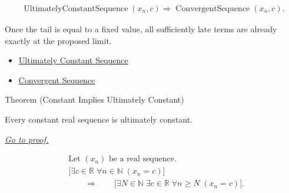\begin{remark*}
\[
\begin{aligned}
\operatorname{UltimatelyConstantSequence}(x_n,c)
\Longrightarrow
\operatorname{ConvergentSequence}(x_n,c).
\end{aligned}
\]
\end{remark*}

\begin{remark*}[Interpretation]
Once the tail is equal to a fixed value, all sufficiently late terms are
already exactly at the proposed limit.
\end{remark*}

\begin{dependencies}
\begin{itemize}
  \item \hyperref[def:ultimately-constant-sequence]{Ultimately Constant Sequence}
  \item \hyperref[def:convergent-sequence]{Convergent Sequence}
\end{itemize}
\end{dependencies}


\begin{theorembox}{Theorem (Constant Implies Ultimately Constant)}
\begin{theorem}
\label{thm:constant-implies-ultimately-constant}
Every constant real sequence is ultimately constant.

\smallskip
\noindent
\hyperref[prf:constant-implies-ultimately-constant]{\textit{Go to proof.}}
\end{theorem}
\end{theorembox}

\begin{remark*}
\[
\begin{aligned}
&\text{Let } (x_n) \text{ be a real sequence.}\\
&\bigl[
\exists c \in \mathbb{R}\;
\forall n \in \mathbb{N}\;(x_n = c)
\bigr]\\
&\qquad\Longrightarrow\qquad
\bigl[
\exists N \in \mathbb{N}\;
\exists c \in \mathbb{R}\;
\forall n \ge N\;(x_n = c)
\bigr].
\end{aligned}
\]
\end{remark*}


